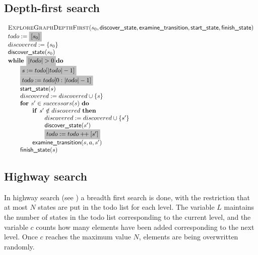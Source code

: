 \documentclass{article}
\newcommand{\concat}{\ensuremath{+\!\!+\:}}
\newcommand{\Space}{\text{\ }}
\newcommand{\If}{\text{\textbf{if }}}
\newcommand{\Do}{\text{\textbf{do }}}
\newcommand{\Then}{\text{\textbf{then }}}
\newcommand{\For}{\text{\textbf{for }}}
\newcommand{\While}{\text{\textbf{while }}}
\begin{document}
\subsection{Depth-first search}
\[
\begin{tabular}{l}
\textsc{ExploreGraphDepthFirst}($s_0, \textsf{discover\_state}, \textsf{examine\_transition},
\textsf{start\_state}, \textsf{finish\_state}$) \\
$todo := \colorbox{lightgray}{$[s_0]$}$ \\
$discovered := \{ s_0 \}$ \\
$\textsf{discover\_state}(s_0)$ \\
$\While \colorbox{lightgray}{$|todo| > 0$} \Do$ \\
\qquad \colorbox{lightgray}{$s := todo[|todo| - 1]$} \\
\qquad \colorbox{lightgray}{$todo := todo[0:|todo| - 1]$} \\
\qquad $\textsf{start\_state}(s)$ \\
\qquad $discovered := discovered \cup \{s\}$ \\
\qquad $\For s' \in successors(s)  \Space \Do$ \\
\qquad \qquad $\If s' \notin discovered \Space \Then$ \\
\qquad \qquad \qquad $discovered := discovered \cup \{s' \}$ \\
\qquad \qquad \qquad $\textsf{discover\_state}(s')$ \\
\qquad \qquad \qquad \colorbox{lightgray}{$todo := todo \concat [s']$} \\
\qquad \qquad $\textsf{examine\_transition}(s, a, s')$ \\
\qquad $\textsf{finish\_state}(s)$ \\
\end{tabular}
\]

\newpage
\subsection{Highway search}

In highway search (see \cite{DBLP:journals/jlp/EngelsGWW09}) a breadth first search is done, with the restriction that at most $N$ states are put in the todo list for each level. The variable $L$ maintains the number of states in the todo list corresponding to the current level, and the variable $c$ counts how many elements have been added corresponding to the next level. Once $c$ reaches the maximum value $N$,  elements are being overwritten randomly. 
\end{document}
